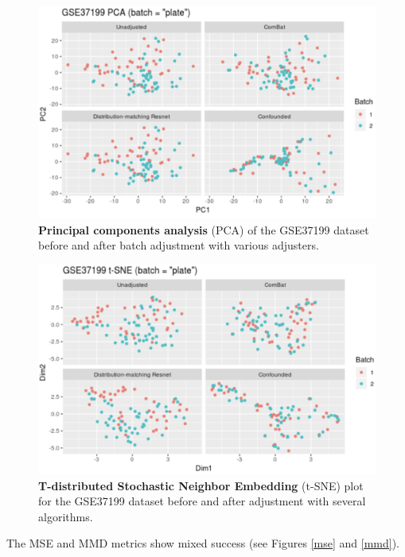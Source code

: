 \documentclass[notitlepage]{article}
\begin{document}
\begin{figure}
	\centering
	\includegraphics[width=4.5in]{figures/rough/pca}
	\caption{\textbf{Principal components analysis} (PCA) of the GSE37199 dataset before and after batch adjustment with various adjusters.}
	\label{fig:pca}
\end{figure}
\begin{figure}
	\centering
	\includegraphics[width=4.5in]{figures/rough/tsne}
	\caption{\textbf{T-distributed Stochastic Neighbor Embedding} (t-SNE) plot for the GSE37199 dataset before and after adjustment with several algorithms.}
	\label{fig:tsne}
\end{figure}

The MSE and MMD metrics show mixed success (see Figures \ref{mse} and \ref{mmd}).
\end{document}
